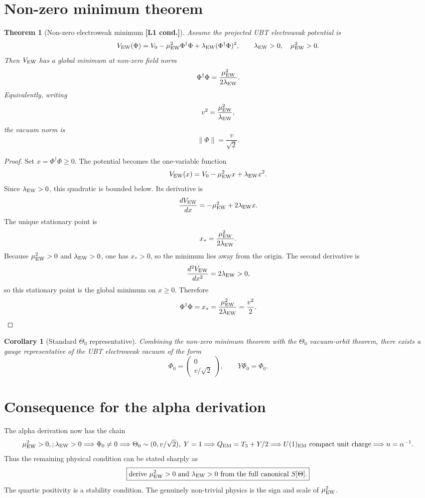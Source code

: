\documentclass[12pt,a4paper]{article}
\newtheorem{theorem}[definition]{Theorem}
\newtheorem{corollary}[definition]{Corollary}
\newcommand{\Lone}{\textbf{[L1 cond.]}}
\begin{document}
\section{Non-zero minimum theorem}

\begin{theorem}[Non-zero electroweak minimum \Lone]
Assume the projected UBT electroweak potential is
\[
  V_{\rm EW}(\Phi)
  =
  V_0-\mu_{\rm EW}^2\Phi^\dagger\Phi
  +\lambda_{\rm EW}(\Phi^\dagger\Phi)^2,
  \qquad
  \lambda_{\rm EW}>0,
  \quad
  \mu_{\rm EW}^2>0.
\]
Then $V_{\rm EW}$ has a global minimum at non-zero field norm
\[
  \Phi^\dagger\Phi=\frac{\mu_{\rm EW}^2}{2\lambda_{\rm EW}}.
\]
Equivalently, writing
\[
  v^2=\frac{\mu_{\rm EW}^2}{\lambda_{\rm EW}},
\]
the vacuum norm is
\[
  \|\Phi\|=\frac{v}{\sqrt2}.
\]
\end{theorem}

\begin{proof}
Set $x=\Phi^\dagger\Phi\ge0$.  The potential becomes the one-variable function
\[
  V_{\rm EW}(x)=V_0-\mu_{\rm EW}^2x+\lambda_{\rm EW}x^2.
\]
Since $\lambda_{\rm EW}>0$, this quadratic is bounded below.  Its derivative is
\[
  \frac{dV_{\rm EW}}{dx}=-\mu_{\rm EW}^2+2\lambda_{\rm EW}x.
\]
The unique stationary point is
\[
  x_*=\frac{\mu_{\rm EW}^2}{2\lambda_{\rm EW}}.
\]
Because $\mu_{\rm EW}^2>0$ and $\lambda_{\rm EW}>0$, one has $x_*>0$, so the
minimum lies away from the origin.  The second derivative is
\[
  \frac{d^2V_{\rm EW}}{dx^2}=2\lambda_{\rm EW}>0,
\]
so this stationary point is the global minimum on $x\ge0$.  Therefore
\[
  \Phi^\dagger\Phi=x_*=\frac{\mu_{\rm EW}^2}{2\lambda_{\rm EW}}=\frac{v^2}{2}.
\]
\end{proof}

\begin{corollary}[Standard $\Theta_0$ representative]
Combining the non-zero minimum theorem with the $\Theta_0$ vacuum-orbit theorem,
there exists a gauge representative of the UBT electroweak vacuum of the form
\[
  \Phi_0=\begin{pmatrix}0\\v/\sqrt2\end{pmatrix},
  \qquad
  Y\Phi_0=\Phi_0.
\]
\end{corollary}

\section{Consequence for the alpha derivation}

The alpha derivation now has the chain
\[
  \mu_{\rm EW}^2>0,\\;\lambda_{\rm EW}>0
  \Longrightarrow
  \Phi_0\neq0
  \Longrightarrow
  \Theta_0\sim(0,v/\sqrt2),\;Y=1
  \Longrightarrow
  Q_{\rm EM}=T_3+Y/2
  \Longrightarrow
  U(1)_{\rm EM}\text{ compact unit charge}
  \Longrightarrow
  n=\alpha^{-1}.
\]
Thus the remaining physical condition can be stated sharply as
\[
  \boxed{
    \text{derive }\mu_{\rm EW}^2>0\text{ and }\lambda_{\rm EW}>0
    \text{ from the full canonical }S[\Theta].
  }
\]
The quartic positivity is a stability condition.  The genuinely non-trivial
physics is the sign and scale of $\mu_{\rm EW}^2$.
\end{document}
